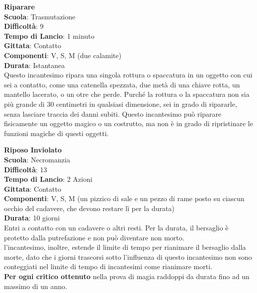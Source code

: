 \begin{multicols}{2}
\medskip\textbf{Riparare}\\
\textbf{Scuola}: Trasmutazione\\
\textbf{Difficoltà}:  9\\
\textbf{Tempo di Lancio}: 1 minuto\\
\textbf{Gittata}: Contatto\\
\textbf{Componenti}: V, S, M (due calamite)\\
\textbf{Durata}: Istantanea\\
Questo incantesimo ripara una singola rottura o spaccatura in un oggetto con cui sei a contatto, come una catenella spezzata, due metà di una chiave rotta, un mantello lacerato, o un otre che perde. Purché la rottura o la spaccatura non sia più grande di 30 centimetri in qualsiasi dimensione, sei in grado di ripararle, senza lasciare traccia dei danni subiti. Questo incantesimo può riparare fisicamente un oggetto magico o un costrutto, ma non è in grado di ripristinare le funzioni magiche di questi oggetti.

\medskip\textbf{Riposo Inviolato}\\
\textbf{Scuola}: Necromanzia\\
\textbf{Difficoltà}:  13\\
\textbf{Tempo di Lancio}: 2 Azioni\\
\textbf{Gittata}: Contatto\\
\textbf{Componenti}: V, S, M (un pizzico di sale e un pezzo di rame posto su ciascun occhio del cadavere, che devono restare lì per la durata)\\
\textbf{Durata}: 10 giorni\\
Entri a contatto con un cadavere o altri resti. Per la durata, il bersaglio è protetto dalla putrefazione e non può diventare non morto. \\
l'incantesimo, inoltre, estende il limite di tempo per rianimare il bersaglio dalla morte, dato che i giorni trascorsi sotto l’influenza di questo incantesimo non  sono conteggiati nel limite di tempo di incantesimi come rianimare morti.\\
\textbf{Per ogni critico ottenuto} nella prova di magia raddoppi da durata fino ad un massimo di un anno.


\end{multicols}
